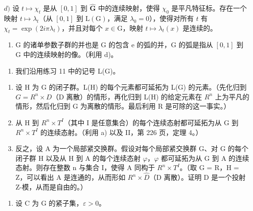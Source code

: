 \(d)\) 设 \(t \mapsto \chi_t\) 是从 \([0,1]\) 到 \(\widehat{\mathbf{G}}\) 中的连续映射，使得 \(\chi_0\) 是平凡特征标。存在一个映射 \(t \mapsto \lambda_t\)（从 \([0,1]\) 到 \(\mathrm{L}(\mathrm{G})\)，满足 \(\lambda_0 = 0\)），使得对所有 \(t\) 有 \(\chi_t = \exp(2i\pi\lambda_t)\)，并且对每个 \(x \in \mathrm{G}\)，映射 \(t \mapsto \lambda_t(x)\) 是连续的。

\begin{enumerate}
\def\labelenumi{\alph{enumi})}
\setcounter{enumi}{4}
\tightlist
\item
  G 的诸单参数子群的并也是 G 的包含 e 的弧的并，G 的弧是指从 \([0,1]\) 到 G 中的连续映射的像。（利用 d)。
\end{enumerate}

\begin{enumerate}
\def\labelenumi{\arabic{enumi})}
\setcounter{enumi}{11}
\tightlist
\item
  我们沿用练习 11 中的记号 L(G)。
\end{enumerate}

\begin{enumerate}
\def\labelenumi{\alph{enumi})}
\item
  设 H 为 G 的闭子群。L(H) 的每个元素都可延拓为 L(G) 的元素。（先化归到 \(G = R^{n} \times D\)（D 离散）的情形，再化归到 L(H) 的给定元素在 \(R^{n}\) 上为平凡的情形，然后化归到 G 为离散的情形。最后利用 R 是可除的这一事实。）
\item
  从 H 到 \(R^{n} \times T^{I}\)（其中 I 是任意集合）的每个连续态射都可延拓为从 G 到 \(R^{n} \times T^{I}\) 的连续态射。（利用 a) 以及 II，第 226 页，定理 4。）
\item
  反之，设 A 为一个局部紧交换群。假设对每个局部紧交换群 G、对 G 的每个闭子群 H 以及从 H 到 A 的每个连续态射 \(\varphi\)，\(\varphi\) 都可延拓为从 G 到 A 的连续态射。则存在整数 n 与集合 I，使得 A 同构于 \(R^{n} \times T^{I}\)。（取 G = R，H = Z，可以看出 A 是连通的，从而形如 \(R^{n} \times \widehat{D}\)（D 离散）。证明 D 是一个投射 Z-模，从而是自由的。）
\end{enumerate}

\begin{enumerate}
\def\labelenumi{\arabic{enumi})}
\setcounter{enumi}{12}
\tightlist
\item
  设 C 为 G 的紧子集，\(\varepsilon > 0\)。
\end{enumerate}

